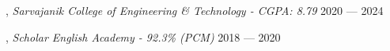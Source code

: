 
, \textit{Sarvajanik College of Engineering \& Technology - CGPA: 8.79}	\hfill 2020 --- 2024

, \textit{Scholar English Academy - 92.3\% (PCM)} \hfill	2018 --- 2020





